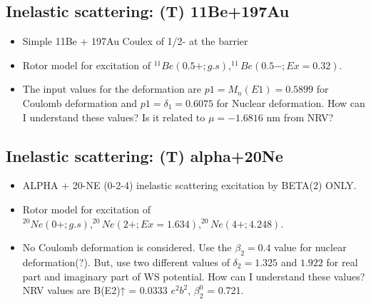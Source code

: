 \documentclass[11pt]{book}
\begin{document}
\subsection{Inelastic scattering: (T) 11Be+197Au}
\begin{itemize}
\item Simple  11Be + 197Au Coulex of 1/2- at the barrier
\item Rotor model for excitation of 
      $^{11}Be(0.5+;g.s),^{11}Be(0.5-;Ex=0.32)$.
\item The input values for the deformation are
      $p1=M_n(E1)=0.5899$ for Coulomb deformation
      and $p1=\delta_1=0.6075$ for Nuclear deformation.
      {\color{blue} How can I understand these values?
      Is it related to $\mu=-1.6816$ nm from NRV?}      
\end{itemize} 

\subsection{Inelastic scattering: (T) alpha+20Ne}
\begin{itemize}
\item ALPHA + 20-NE (0-2-4) inelastic scattering
      excitation by BETA(2) ONLY.
\item Rotor model for excitation of 
      $^{20}Ne(0+;g.s),^{20}Ne(2+;Ex=1.634),^{20}Ne(4+;4.248)$.
\item No Coulomb deformation is considered.
      Use the $\beta_2=0.4$ value for nuclear 
      deformation(?). But, use two different values of
      $\delta_2=1.325$ and $1.922$ for real part and 
      imaginary part of WS potential.
{\color{blue} How can I understand these values?
   NRV values are B(E2)↑ = 0.0333 $e^2b^2$,   	$\beta^0_2$ = 0.721.
}      
\end{itemize} 
\end{document}
